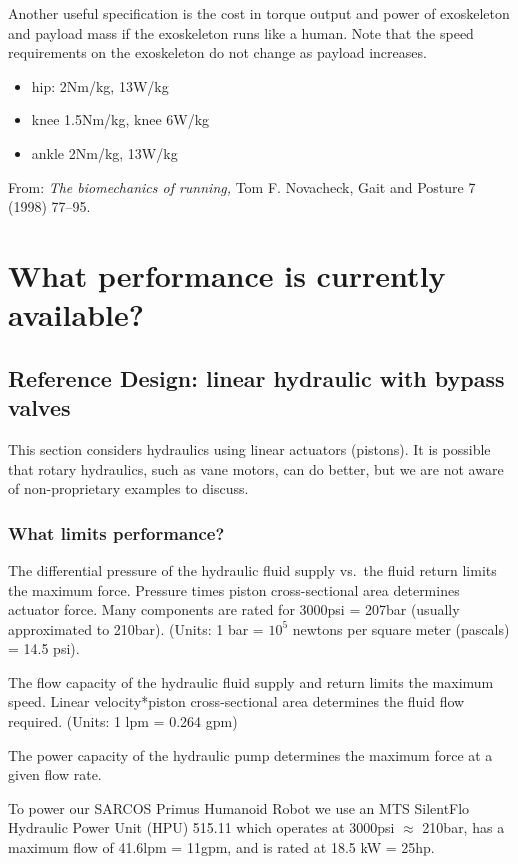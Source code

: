 \documentclass[letterpaper,12pt,fullpage]{article}
\begin{document}
Another useful specification is the cost in torque output and power
of exoskeleton and payload mass if the exoskeleton runs like a human.
Note that the speed requirements on the exoskeleton do not change as
payload increases.
\begin{itemize}
\item
hip: 2Nm/kg, 13W/kg
\item
knee 1.5Nm/kg, knee 6W/kg
\item
ankle 2Nm/kg, 13W/kg
\end{itemize}
From: {\it The biomechanics of running,} Tom F. Novacheck,
Gait and Posture 7 (1998) 77–95.

\section{What performance is currently available?}

\subsection{Reference Design: linear hydraulic with bypass valves}

This section considers hydraulics using linear actuators (pistons).
It is possible that rotary hydraulics, such as vane motors,
can do better, but we are not aware of non-proprietary examples
to discuss.

\subsubsection{What limits performance?}

The differential pressure of the hydraulic fluid supply vs.\ the fluid
return limits the maximum force. Pressure times piston cross-sectional area
determines actuator force.
Many components are rated for 3000psi = 207bar (usually approximated to
210bar).
(Units: 1 bar = $10^5$ newtons per square meter (pascals) = 14.5 psi).

The flow capacity of the hydraulic fluid supply and return limits
the maximum speed. Linear velocity*piston cross-sectional area determines 
the fluid flow required.
(Units: 1 lpm = 0.264 gpm)

The power capacity of the hydraulic pump determines the maximum force
at a given flow rate.

To power our SARCOS Primus Humanoid Robot we use an
MTS SilentFlo Hydraulic Power Unit (HPU) 515.11
which operates at 3000psi $\approx$ 210bar,
has a maximum flow of 41.6lpm = 11gpm, and is rated at
18.5 kW = 25hp.
\end{document}
